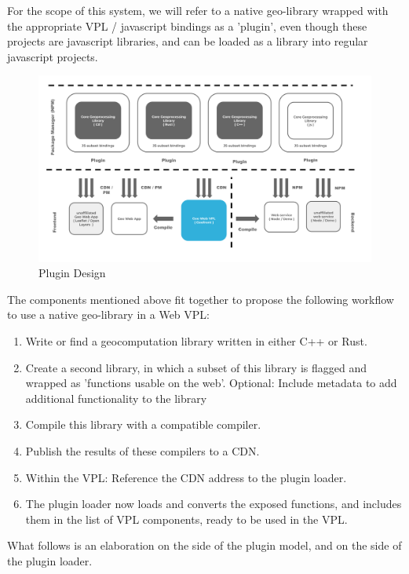 For the scope of this system, we will refer to a native geo-library wrapped with the appropriate VPL / javascript bindings as a 'plugin', even though these projects are javascript libraries, and can be loaded as a library into regular javascript projects. 

\begin{figure}
  \centering
  \graphicspath{ {../../assets/diagrams/} }
  \includegraphics[width=\linewidth]{Model Proposal.png}
  \caption{Plugin Design}
  \label{fig:plugin-model}
\end{figure}

The components mentioned above fit together to propose the following workflow to use a native geo-library in a Web VPL: 
\begin{enumerate}
  \item Write or find a geocomputation library written in either C++ or Rust. 
  \item Create a second library, in which a subset of this 
     library is flagged and wrapped as 'functions usable on the web'.
  \subitem Optional: Include metadata to add additional functionality to the library
  \item Compile this library with a compatible compiler.
  \item Publish the results of these compilers to a \ac{CDN}. 
  
  \item Within the VPL: Reference the CDN address to the plugin loader. 
  \item The plugin loader now loads and converts the exposed functions, and includes them in the list of VPL components, ready to be used in the VPL. 
\end{enumerate}
What follows is an elaboration on the side of the plugin model, and on the side of the plugin loader.

